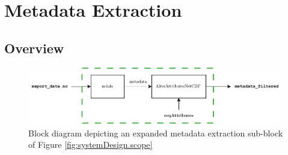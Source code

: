 
\section{Metadata Extraction} \label{sec:systemDesign.metadata}

\subsection{Overview} \label{subsec:systemDesign.metadata.overview}

\begin{figure}[H]
    \centering
    \includegraphics[width=.85\linewidth]{Figures/PipelineDesign/metadataExtraction.pdf}
    \caption{Block diagram depicting an expanded metadata extraction sub-block of Figure \ref{fig:systemDesign.scope}}
    \label{fig:systemDesign.metadata.blockDiagram}
\end{figure}

